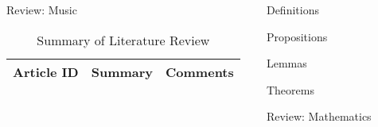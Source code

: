 \begin{frame}[t]
\begin{columns}[t]
\begin{column}{\onecolwid}
\begin{alertblock}{Review: Music}
\begin{table}[H]
	\centering
	\begin{tabular}{r|p{12cm}|l}
	\hline
	Article ID  & Summary & Comments \\
	\hline
	\hline
	\end{tabular}
	\caption{Summary of Literature Review}
\end{table}		

\end{alertblock}


\end{column}

\begin{column}{\onecolwid} %
\begin{alertblock}{Definitions}
\end{alertblock}
\begin{alertblock}{Propositions}
\end{alertblock}
\begin{alertblock}{Lemmas}
\end{alertblock}
\begin{alertblock}{Theorems}
\end{alertblock}
\begin{alertblock}{Review: Mathematics}
\end{alertblock}
\end{column}
\begin{column}{\onecolwid} %

\end{column}
\end{columns}
\end{frame}
